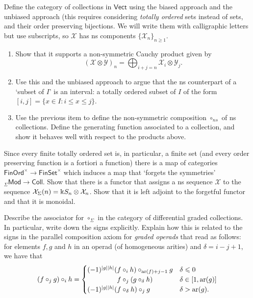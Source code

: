  \begin{question}
Define the category of collections
in $\mathsf{Vect}$
using the biased approach and the 
unbiased approach (this requires considering
\emph{totally ordered} sets instead of sets,
and their order preserving bijections. We will
write them with calligraphic letters but
use subscripts, so $\mathcal X$ has ns
components $\{\mathcal X_n\}_{n\geqslant 1}$.

\begin{enumerate}
\item Show
that it supports a non-symmetric Cauchy
product given by 
\[ (\mathcal{X}\otimes\mathcal{Y})_n =
  \bigoplus_{i+j=n} \mathcal{X}_i\otimes
   	\mathcal{Y}_j.\]
   	
   	\item Use this and the unbiased approach to 
   	argue that the ns counterpart of a
   	`subset of $I$' is an interval:
   	a totally ordered subset of $I$ of the
   	form $[i,j] = \{ x\in I : i\leqslant x \leqslant j\}$.
 \item Use the previous item to define the
 non-symmetric composition $\circ_{ns}$
  of ns collections.
 Define the generating function associated
 to a collection, and show it behaves
 well with respect to the products above. 
\end{enumerate}
\end{question}

\begin{question}
Since every finite totally ordered set
is, in particular, a finite set (and
every order preserving function is a
fortiori a function) there is a 
map of categories 
$ \mathsf{FinOrd}^\times \longrightarrow
 	\mathsf{FinSet}^\times$
which induces a map that `forgets the
symmetries' ${}_\Sigma\mathsf{Mod}	\longrightarrow\mathsf{Coll}$. 
Show that there is a functor that assigns
a ns sequence $\mathcal{X}$ to the 
sequence $\mathcal{X}_\Sigma(n) =
\Bbbk S_n\otimes \mathcal{X}_n$.  Show that it is
left adjoint to the forgetful functor and that it is monoidal. 
\end{question}
 
\begin{question}
Describe the associator for $\circ_\Sigma$ in the
category of differential graded collections. 
In particular,
write down the signs explicitly. Explain
how this is related to the signs
in the parallel composition axiom
for \emph{graded operads} that read as follows:
for elements $f,g$ and $h$
in an operad (of homogeneous arities)
and $\delta = i-j+1$, we have that
\[ 
(f \circ_j g) \circ_i h  = 
 	\begin{cases} 
 		(-1)^{|g||h|}
 		 (f \circ_i h) \circ_{\ari(f)+j-1} g
 		  	& \delta \leqslant 0  \\
 		 \phantom{(-1)^{|g||h|}(} 	f\circ_j (g \circ_\delta h) &
 		  	\delta\in [1,\ari(g)] \\
 		(-1)^{|g||h|}
   	(f \circ_\delta h) \circ_j g
   		 & \delta > \ari(g).
 		   \end{cases}
 		 \]
\end{question}

